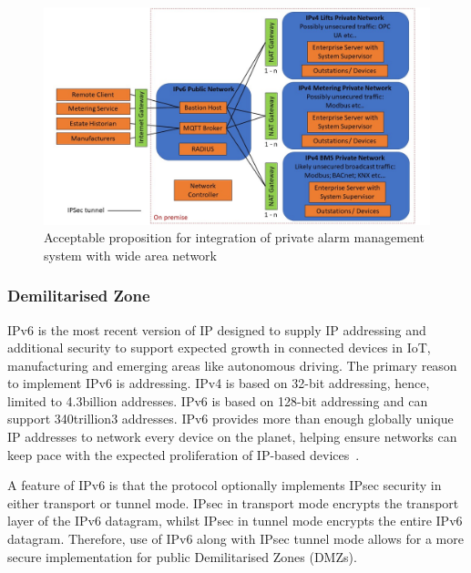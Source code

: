 \documentclass[11pt, oneside]{book}   	%
\begin{document}
\pagebreak

\FloatBarrier
\begin{figure}
\begin{center}
\includegraphics[width=1\textwidth]{acceptablePublicNetwork.jpg}
\caption{Acceptable proposition for integration of private alarm management system with wide area network}
\label{Integrated Network Configuration figure}
\end{center}
\end{figure}
\FloatBarrier

\pagebreak

\subsubsection{Demilitarised Zone}
IPv6 is the most recent version of IP designed to supply IP addressing and additional security to support expected growth in connected devices in IoT, manufacturing and emerging areas like autonomous driving.
The primary reason to implement IPv6 is addressing. 
IPv4 is based on 32-bit addressing, hence, limited to 4.3billion addresses.
IPv6 is based on 128-bit addressing and can support 340trillion3 addresses.
IPv6 provides more than enough globally unique IP addresses to network every device on the planet, helping ensure networks can keep pace with the expected proliferation of IP-based devices~\cite{ipv6}.\

A feature of IPv6 is that the protocol optionally implements IPsec security in either transport or tunnel mode.
IPsec in transport mode encrypts the transport layer of the IPv6 datagram, whilst IPsec in tunnel mode encrypts the entire IPv6 datagram.
Therefore, use of IPv6 along with IPsec tunnel mode allows for a more secure implementation for public Demilitarised Zones (DMZs).\
\end{document}
